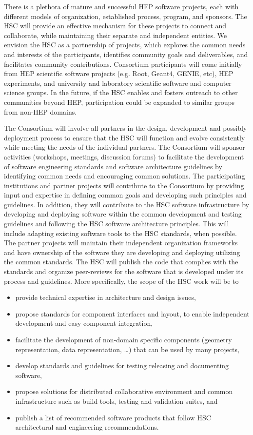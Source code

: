 \documentclass[12pt,letterpaper,fleqn]{article}
\begin{document}
There is a plethora of mature and successful HEP software projects,
each with different models of organization, established process,
program, and sponsors.  The HSC will provide an effective mechanism
for these projects to connect and collaborate, while maintaining
their separate and independent entities.  We envision the HSC as a
partnership of projects, which explores the common needs and interests
of the participants, identifies community goals and deliverables,
and facilitates community contributions. Consortium participants
will come initially from HEP scientific software projects (e.g.
Root, Geant4, GENIE, etc), HEP experiments, and university and
laboratory scientific software and computer science groups.  In the
future, if the HSC enables and fosters outreach to other communities
beyond HEP, participation could be expanded to similar groups from
non-HEP domains.

The Consortium will involve all partners in the design, development
and possibly deployment process to ensure that the HSC will function
and evolve consistently while meeting the needs of the individual
partners.  The Consortium will sponsor activities (workshops,
meetings, discussion forums) to facilitate the development of
software engineering standards and software architecture guidelines
by identifying common needs and encouraging common solutions. The
participating institutions and partner projects will contribute to
the Consortium by providing input and expertise in defining common
goals and developing such principles and guidelines.  In addition,
they will contribute to the HSC software infrastructure by developing
and deploying software within the common development and testing
guidelines and following the HSC software architecture principles.
This will include adapting existing software tools to the HSC
standards, when possible.  The partner projects will maintain their
independent organization frameworks and have ownership of the
software they are developing and deploying utilizing the common
standards.  The HSC will publish the code that complies with the
standards and organize peer-reviews for the software that is developed
under its process and guidelines.  More specifically, the scope of
the HSC work will be to
\begin{itemize}
\item provide technical expertise in architecture and design issues,
\item propose standards for component interfaces and layout, to
enable independent development and easy component integration,
\item facilitate the development of non-domain specific components
(geometry representation, data representation, …) that can be used
by many projects,
\item develop standards and guidelines for testing releasing and
documenting software,
\item propose solutions for distributed collaborative environment
and common infrastructure such as build tools, testing and validation
suites, and
\item publish a list of recommended software products that follow HSC
architectural and engineering recommendations.
\end{itemize}
\end{document}
